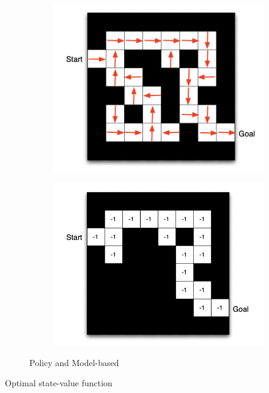 \documentclass[english]{article}
\begin{document}
\begin{figure}
\centering
\begin{subfigure}{.5\textwidth}
  \centering
  \includegraphics[scale=0.5]{policy.png}
\end{subfigure}%
\begin{subfigure}{.5\textwidth}
  \centering
  \includegraphics[scale=0.5]{model.png}
\end{subfigure}
\caption{Policy and Model-based}
\label{maze2}
\end{figure}

\item Optimal state-value function
\end{document}
